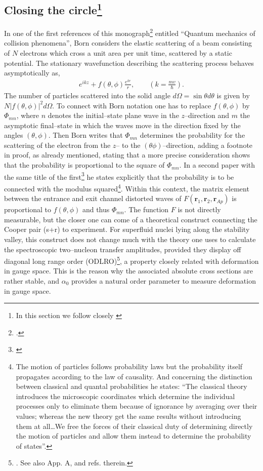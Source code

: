 \subsection[Closing the circle]{Closing the circle\footnote{In this section we follow closely \cite{Pais:86}}}
In one of the first references of this monograph\footnote{\cite{Born:26}.} entitled ``Quantum mechanics of collision phenomena'', Born considers the elastic scattering of a beam consisting of $N$ electrons which cross a unit area per unit time, scattered by a static potential. The stationary wavefunction describing the scattering process behaves asymptotically as,
\begin{align}
e^{ikz}+f(\theta,\phi)\frac{e^{kr}}{r},\quad\quad \left(k=\frac{mv}{\hbar}\right).
\end{align}
The number of particles scattered into the solid angle $d\Omega=\sin\theta d\theta$ is given by $N|f(\theta,\phi)|^2d\Omega$. To connect with Born notation one has to replace $f(\theta,\phi)$ by $\Phi_{mn}$, where $n$ denotes the initial--state plane wave in the $z$--direction and $m$ the asymptotic final--state in which the waves move in the direction fixed by the angles $(\theta,\phi)$. Then Born writes that $\Phi_{mn}$ determines the probability for the scattering of the electron from the $z$-- to the $(\theta\phi)$--direction, adding a footnote in proof, as already mentioned, stating that a more precise consideration shows that the probability is proportional to the square of $\Phi_{mn}$. In a second paper with the same title of the first\footnote{\cite{Born:26b}} he states explicitly that the probability is to be connected with the modulus squared\footnote{The motion of particles follows probability laws but the probability itself propagates according to the law of causality. And concerning the distinction between classical and quantal probabilities he states: ``The classical theory introduces the microscopic coordinates which determine the individual processes only to eliminate them because of ignorance by averaging over their values; whereas the new theory get the same results without introducing them at all\dots We free the forces of their classical duty of determining directly the motion of particles and allow them instead to determine the probability of states''.}. Within this context, the matrix element between the entrance and exit channel distorted waves of $F(\mathbf r_1,\mathbf r_2,\mathbf r_{Ap})$ is proportional to $f(\theta,\phi)$ and thus $\Phi_{mn}$. The function $F$ is not directly measurable, but the closer one can come of a theoretical construct connecting the Cooper pair (s+r) to experiment. For superfluid nuclei lying along the stability valley, this construct does not change much with the theory one uses to calculate the spectroscopic two--nucleon transfer amplitudes,  provided they display off diagonal long range order (ODLRO)\footnote{\cite{Yang:62}. See also App. A, \cite{Potel:17} and refs. therein.}, a property closely related with deformation in gauge space. This is the reason why the associated absolute cross sections are rather stable, and $\alpha_0$ provides a natural order parameter to measure deformation in gauge space.


